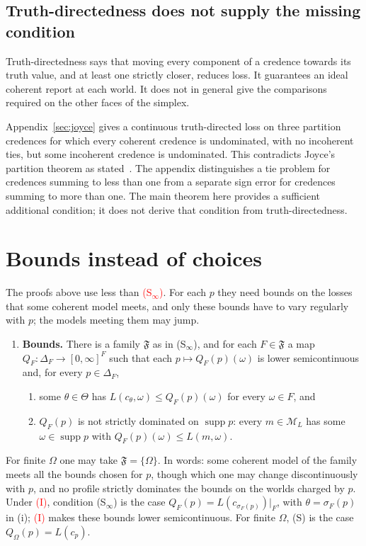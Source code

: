 \documentclass[11pt]{article}
\theoremstyle{definition}
\theoremstyle{remark}
\newcommand{\M}{\mathcal M}
\newcommand{\F}{\mathfrak F}
\newcommand{\supp}{\operatorname{supp}}
\begin{document}
\subsection{Truth-directedness does not supply the missing condition}
Truth-directedness says that moving every component of a credence towards its truth value, and at least one strictly closer, reduces loss. It guarantees an ideal coherent report at each world. It does not in general give the comparisons required on the other faces of the simplex.

Appendix~\ref{sec:joyce} gives a continuous truth-directed loss on three partition credences for which every coherent credence is undominated, with no incoherent ties, but some incoherent credence is undominated. This contradicts Joyce's partition theorem as stated~\cite[Theorem~2]{Joyce}. The appendix distinguishes a tie problem for credences summing to less than one from a separate sign error for credences summing to more than one. The main theorem here provides a sufficient additional condition; it does not derive that condition from truth-directedness.

\appendix
\section{Bounds instead of choices}\label{sec:bounds}
The proofs above use less than \textcolor{red}{(S$_\infty$)}. For each $p$ they need bounds on the losses that some coherent model meets, and only these bounds have to vary regularly with $p$; the models meeting them may jump.
\begin{enumerate}[label=\textbf{(B)},leftmargin=*]
\item \textbf{Bounds.} There is a family $\F$ as in (S$_\infty$), and for each $F\in\F$ a map $Q_F:\Delta_F\to[0,\infty]^F$ such that each $p\mapsto Q_F(p)(\omega)$ is lower semicontinuous and, for every $p\in\Delta_F$,
\begin{enumerate}[label=(\roman*)]
\item some $\theta\in\Theta$ has $L(c_\theta,\omega)\le Q_F(p)(\omega)$ for every $\omega\in F$, and
\item $Q_F(p)$ is not strictly dominated on $\supp p$: every $m\in\M_L$ has some $\omega\in\supp p$ with $Q_F(p)(\omega)\le L(m,\omega)$.
\end{enumerate}
\end{enumerate}
For finite $\Omega$ one may take $\F=\{\Omega\}$. In words: some coherent model of the family meets all the bounds chosen for $p$, though which one may change discontinuously with $p$, and no profile strictly dominates the bounds on the worlds charged by $p$. Under \textcolor{red}{(I)}, condition (S$_\infty$) is the case $Q_F(p)=L(c_{\sigma_F(p)})|_F$, with $\theta=\sigma_F(p)$ in (i); \textcolor{red}{(I)} makes these bounds lower semicontinuous. For finite $\Omega$, (S) is the case $Q_\Omega(p)=L(c_p)$.
\end{document}

